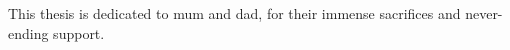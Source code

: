 \cleardoublepage

\begin{dedication}
This thesis is dedicated to mum and dad, for their immense sacrifices and never-ending support.
\end{dedication}
